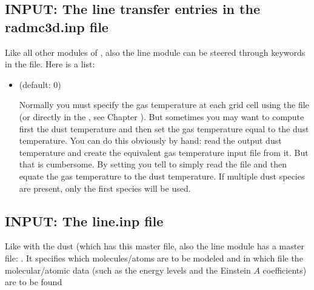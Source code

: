\documentclass[letterpaper,10pt,english]{sphinxmanual}
\begin{document}
\subsection{INPUT: The line transfer entries in the radmc3d.inp file}
\label{\detokenize{lineradtrans:input-the-line-transfer-entries-in-the-radmc3d-inp-file}}\label{\detokenize{lineradtrans:sec-line-radmc-inp}}
Like all other modules of , also the line module
can be steered through keywords in the  file.
Here is a list:
\begin{itemize}
\item {} 
 (default: 0)

Normally you must specify the gas temperature at each grid cell using the
 file (or directly in the , see
Chapter {\hyperref[\detokenize{internalsetup:chap-internal-setup}]{}}). But sometimes you may want to compute
first the dust temperature and then set the gas temperature equal to the dust
temperature. You can do this obviously by hand: read the output dust
temperature and create the equivalent gas temperature input file from it. But
that is cumbersome.  By setting  you tell  to
simply read the  file and then equate the gas
temperature to the dust temperature. If multiple dust species are present,
only the first species will be used.

\end{itemize}


\subsection{INPUT: The line.inp file}
\label{\detokenize{lineradtrans:input-the-line-inp-file}}\label{\detokenize{lineradtrans:sec-line-dot-inp}}
Like with the dust (which has this  master file,
also the line module has a master file: . It specifies
which molecules/atoms are to be modeled and in which file the
molecular/atomic data (such as the energy levels and the Einstein \(A\)
coefficients) are to be found
\end{document}
